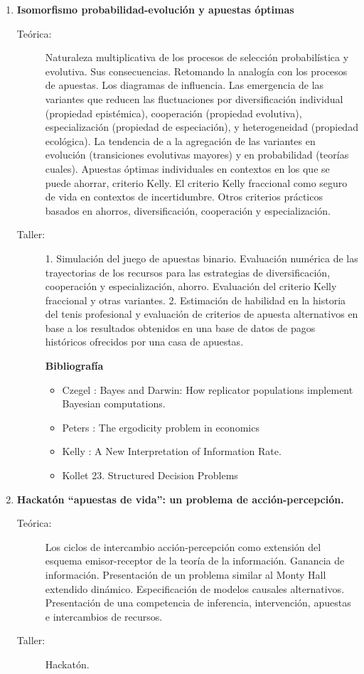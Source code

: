 \documentclass[11pt]{article}
\begin{document}
\begin{enumerate}
\item \textbf{Isomorfismo probabilidad-evolución y apuestas óptimas}
\vspace{-0.15cm}
\begin{description}
\item[Teórica:]
Naturaleza multiplicativa de los procesos de selección probabilística y evolutiva.
Sus consecuencias.
Retomando la analogía con los procesos de apuestas.
Los diagramas de influencia.
Las emergencia de las variantes que reducen las fluctuaciones por diversificación individual (propiedad epistémica), cooperación (propiedad evolutiva), especialización (propiedad de especiación), y heterogeneidad (propiedad ecológica).
La tendencia de a la agregación de las variantes en evolución (transiciones evolutivas mayores) y en probabilidad (teorías cuales).
Apuestas óptimas individuales en contextos en los que se puede ahorrar, criterio Kelly.
El criterio Kelly fraccional como seguro de vida en contextos de incertidumbre.
Otros criterios prácticos basados en ahorros, diversificación, cooperación y especialización.
\item[Taller:]
1. Simulación del juego de apuestas binario.
Evaluación numérica de las trayectorias de los recursos para las estrategias de diversificación, cooperación y especialización, ahorro.
Evaluación del criterio Kelly fraccional y otras variantes.
2. Estimación de habilidad en la historia del tenis profesional y evaluación de criterios de apuesta alternativos en base a los resultados obtenidos en una base de datos de pagos históricos ofrecidos por una casa de apuestas.
\item[] \textbf{Bibliografía}
\begin{itemize}
\item Czegel \cite{czegel2022-bayesDarwin}: Bayes and Darwin: How replicator populations implement Bayesian computations.
\item Peters \cite{peters2019-ergodicityEconomics}: The ergodicity problem in economics
\item Kelly \cite{kelly1956-informationRate}: A New Interpretation of Information Rate.
\item Kollet \cite{koller2009-PGM} 23. Structured Decision Problems
\end{itemize}
\end{description}

\item \textbf{Hackatón ``apuestas de vida'': un problema de acción-percepción.}
\vspace{-0.15cm}
\begin{description}
\item[Teórica:]
Los ciclos de intercambio acción-percepción como extensión del esquema emisor-receptor de la teoría de la información.
Ganancia de información.
Presentación de un problema similar al Monty Hall extendido dinámico.
Especificación de modelos causales alternativos.
Presentación de una competencia de inferencia, intervención, apuestas e intercambios de recursos.
\item[Taller:] Hackatón.
\end{description}


\end{enumerate}
\end{document}
